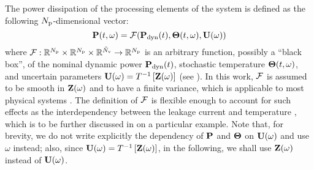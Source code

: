 The power dissipation of the processing elements of the system is defined as the following ${N_\text{p}}$-dimensional vector:
\begin{equation} \elabel{power-model}
  \vP(\t, \o) = \f(\vP_\dyn(\t), \vTO(\t, \o), \vU(\o))
\end{equation}
where $\mathcal{F}: \mathbb{R}^{N_\text{p}} \times \mathbb{R}^{N_\text{p}} \times \mathbb{R}^{\tilde{N}_\text{v}} \to \mathbb{R}^{N_\text{p}}$ is an arbitrary function, possibly a ``black box'', of the nominal dynamic power $\mathbf{P}_{\text{dyn}}(t)$, stochastic temperature ${\boldsymbol\Theta}(t, \omega)$, and uncertain parameters $\mathbf{U}(\omega) = T^{-1}\left[\mathbf{Z}(\omega)\right]$ (see ). In this work, $\mathcal{F}$ is assumed to be smooth in $\mathbf{Z}(\omega)$ and to have a finite variance, which is applicable to most physical systems \cite{xiu2002}. The definition of $\mathcal{F}$ is flexible enough to account for such effects as the interdependency between the leakage current and temperature \cite{srivastava2010, liu2007}, which is to be further discussed in  on a particular example. Note that, for brevity, we do not write explicitly the dependency of $\mathbf{P}$ and ${\boldsymbol\Theta}$ on $\mathbf{U}(\omega)$ and use $\omega$ instead; also, since $\mathbf{U}(\omega) = T^{-1}\left[\mathbf{Z}(\omega)\right]$, in the following, we shall use $\mathbf{Z}(\omega)$ instead of $\mathbf{U}(\omega)$.
